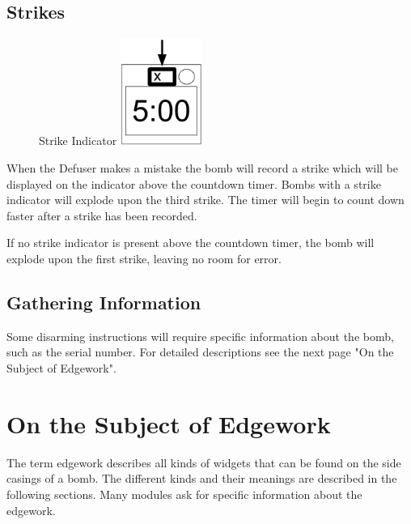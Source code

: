 \documentclass{../../ktane-mod}
\begin{document}
\subsection*{Strikes}
\begin{figure} %
  \vspace{-2\baselineskip}
  Strike Indicator
  \centering
  \includegraphics[height=3.5cm]{images/strike}
  \label{fig:Strikes}
\end{figure}
When the Defuser makes a mistake the bomb will record a strike which will be displayed on the indicator above the countdown timer.
Bombs with a strike indicator will explode upon the third strike.
The timer will begin to count down faster after a strike has been recorded.

If no strike indicator is present above the countdown timer, the bomb will explode upon the first strike, leaving no room for error.

\subsection*{Gathering Information}
Some disarming instructions will require specific information about the bomb, such as the serial number.
For detailed descriptions see the next page "On the Subject of Edgework".

\clearpage

\section*{On the Subject of Edgework}
The term edgework describes all kinds of widgets that can be found on the side casings of a bomb.
The different kinds and their meanings are described in the following sections.
Many modules ask for specific information about the edgework.
\end{document}
